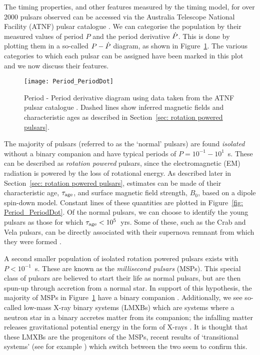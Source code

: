 The timing properties, and other features measured by the timing model, for
over 2000 pulsars observed can be accessed via the Australia Telescope National
Facility (ATNF) pulsar catalogue \citep{ATNF}.  We can categorise the
population by their measured values of period $P$ and the period derivative
$\dot{P}$. This is done by plotting them in a so-called $P - \dot{P}$ diagram, as
shown in Figure~\ref{fig: Period_PeriodDot}.  The various categories to which
each pulsar can be assigned have been marked in this plot and we now discuss
their features.

\begin{figure}[htb]
\centering
\texttt{[image: Period\_PeriodDot]} 
\caption{Period -
Period derivative diagram using data taken from the ATNF pulsar catalogue
\citep{ATNF}. Dashed lines show inferred magnetic fields and characteristic
ages as described in Section~\ref{sec: rotation powered pulsars}.}
\label{fig: Period_PeriodDot}
\end{figure}

The majority of pulsars (referred to as the `normal' pulsars) are found
\emph{isolated} without a binary companion and have typical periods of
$P=10^{-1}-10^{1}$~s. These can be described as \emph{rotation powered}
pulsars, since the electromagnetic (EM) radiation is powered by the loss of
rotational energy. As described later in Section~\ref{sec: rotation powered
pulsars}, estimates can be made of their characteristic age, $\tau_{\mathrm{age}}$, and
surface magnetic field strength, $B_{0}$, based on a dipole spin-down model.
Constant lines of these quantities are plotted in Figure~\ref{fig:
Period_PeriodDot}. Of the normal pulsars, we can choose to identify the young
pulsars as those for which $\tau_{\mathrm{age}}<10^{5}$~yrs. Some of these, such as the
Crab and Vela pulsars, can be directly associated with their supernova remnant
from which they were formed \citep{Kaspi1996}.

A second smaller population of isolated rotation powered pulsars exists with
$P<10^{-1}$~s. These are known as the \emph{millisecond pulsars} (MSPs). This
special class of pulsars are believed to start their life as normal pulsars,
but are then spun-up through accretion from a normal star. In support of this
hypothesis, the majority of MSPs in Figure~\ref{fig: Period_PeriodDot} have a
binary companion \citep{wijnands1998millisecond}. Additionally, we see so-called
low-mass X-ray binary systems (LMXBs) which are systems where a neutron star in
a binary accretes matter from its companion; the infalling matter releases
gravitational potential energy in the form of X-rays \citep{lewin1997x}. It is
thought that these LMXBs are the progenitors of the MSPs, recent results of
`transitional systems' (see for example \citep{archibald2009radio}) which
switch between the two seem to confirm this.

